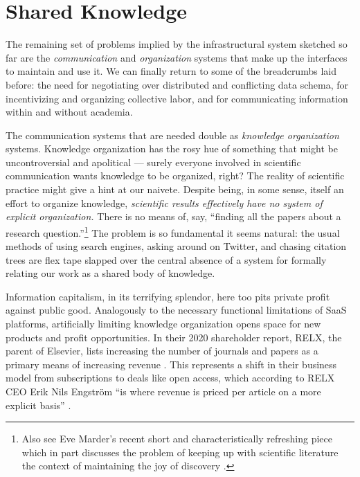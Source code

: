 \hypertarget{shared-knowledge}{%
\section{Shared Knowledge}\label{shared-knowledge}}

The remaining set of problems implied by the infrastructural system
sketched so far are the \emph{communication} and \emph{organization}
systems that make up the interfaces to maintain and use it. We can
finally return to some of the breadcrumbs laid before: the need for
negotiating over distributed and conflicting data schema, for
incentivizing and organizing collective labor, and for communicating
information within and without academia.

The communication systems that are needed double as \emph{knowledge
organization} systems. Knowledge organization has the rosy hue of
something that might be uncontroversial and apolitical --- surely
everyone involved in scientific communication wants knowledge to be
organized, right? The reality of scientific practice might give a hint
at our naivete. Despite being, in some sense, itself an effort to
organize knowledge, \emph{scientific results effectively have no system
of explicit organization.} There is no means of, say, ``finding all the
papers about a research question.''\footnote{Also see Eve Marder's
  recent short and characteristically refreshing piece which in part
  discusses the problem of keeping up with scientific literature the
  context of maintaining the joy of discovery \citep{marderMaintainingJoyDiscovery2022} .} The problem is so fundamental
it seems natural: the usual methods of using search engines, asking
around on Twitter, and chasing citation trees are flex tape slapped over
the central absence of a system for formally relating our work as a
shared body of knowledge.

Information capitalism, in its terrifying splendor, here too pits
private profit against public good. Analogously to the necessary
functional limitations of SaaS platforms, artificially limiting
knowledge organization opens space for new products and profit
opportunities. In their 2020 shareholder report, RELX, the parent of
Elsevier, lists increasing the number of journals and papers as a
primary means of increasing revenue \citep{RELXAnnualReport2020} .
This represents a shift in their business model from subscriptions to
deals like open access, which according to RELX CEO Erik Nils Engström
``is where revenue is priced per article on a more explicit basis'' \citep{relx2020ResultsPresentation2021} .

